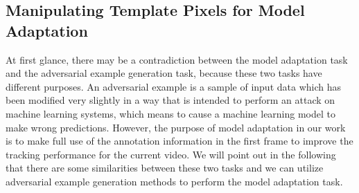 \subsection{Manipulating Template Pixels for Model Adaptation}
At first glance, there may be a contradiction between the model adaptation task and the adversarial example generation task, because these two tasks have different purposes. An adversarial example \cite{kurakin2017adversarial} is a sample of input data which has been modified very slightly in a way that is intended to perform an attack on machine learning systems, which means to cause a machine learning model to make wrong predictions. However, the purpose of model adaptation in our work is to make full use of the annotation information in the first frame to improve the tracking performance for the current video. We will point out in the following that there are some similarities between these two tasks and we can utilize adversarial example generation methods to perform the model adaptation task.

